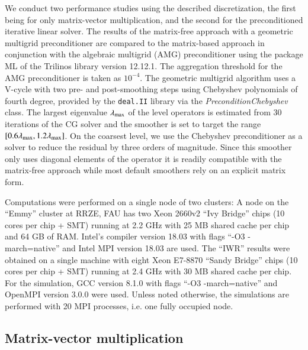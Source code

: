 \documentclass[times,doublespace]{nmeauth}
\begin{document}
We conduct two performance studies using the described discretization, the first being for only matrix-vector multiplication, and the second for the preconditioned iterative linear solver.
The results of the matrix-free approach with a geometric multigrid preconditioner are compared to the matrix-based approach in conjunction with the algebraic multigrid (AMG) preconditioner using the package ML \cite{Gee2006a} of the Trilinos \cite{Heroux2005} library version 12.12.1.
The aggregation threshold for the AMG preconditioner is taken as $10^{-4}$.
The geometric multigrid algorithm uses a V-cycle with two pre- and post-smoothing steps using Chebyshev polynomials \cite{Varga2009} of fourth degree, provided
by the \texttt{deal.II} library via the \textit{PreconditionChebyshev} class.
The largest eigenvalue $\lambda_{\rm{max}}$ of the level operators is estimated from $30$ iterations of the CG solver and the smoother
is set to target the range $[0.6\lambda_{\rm{max}}, 1.2\lambda_{\rm{max}}]$.
On the coarsest level, we use the Chebyshev preconditioner as a solver \cite{Varga2009} to reduce the residual by three orders of magnitude.
Since this smoother only uses diagonal elements of the operator it is readily compatible with the matrix-free approach while most default smoothers rely on an explicit matrix form.

Computations were performed on a single node of two clusters:
A node on the ``Emmy'' cluster at RRZE, FAU has two Xeon 2660v2 ``Ivy Bridge'' chips (10 cores per chip + SMT) running at 2.2 GHz with 25 MB shared cache per chip and 64 GB of RAM. Intel's compiler version 18.03 with flags ``-O3 -march=native'' and Intel MPI version 18.03 are used.
The ``IWR'' results were obtained on a single machine with eight Xeon E7-8870 ``Sandy Bridge'' chips (10 cores per chip  + SMT) running at 2.4 GHz with 30 MB shared cache per chip. For the simulation, GCC version 8.1.0 with flags ``-O3 -march=native'' and OpenMPI version 3.0.0 were used.
Unless noted otherwise, the simulations are performed with 20 MPI processes, i.e. one fully occupied node.

\subsection{Matrix-vector multiplication}
\end{document}
